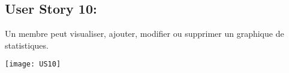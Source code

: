 \newpage{}
\subsection{User Story 10:}
Un membre peut visualiser, ajouter, modifier ou supprimer un graphique de statistiques.


  \begin{center}
        \texttt{[image: US10]}
  \end{center}
